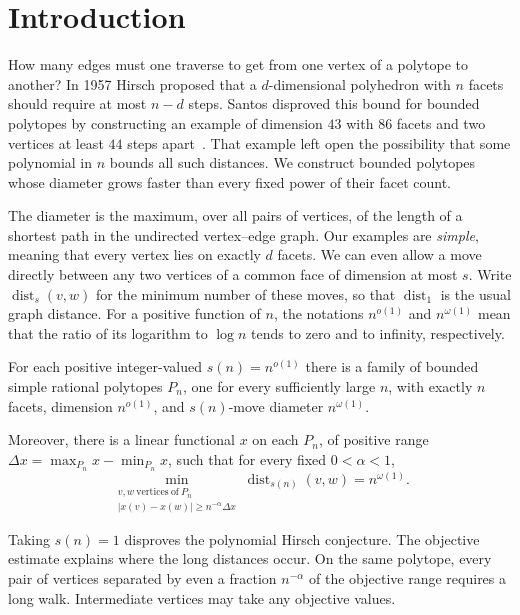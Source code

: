 \section{Introduction}\label{sec:introduction}

How many edges must one traverse to get from one vertex of a polytope to
another? In 1957 Hirsch proposed that a \(d\)-dimensional polyhedron with
\(n\) facets should require at most \(n-d\) steps. Santos disproved this
bound for bounded polytopes by constructing an example of dimension \(43\)
with \(86\) facets and two vertices at least \(44\) steps apart~\cite{santos}.
That example left open the possibility that some polynomial in \(n\)
bounds all such distances. We construct bounded polytopes whose diameter
grows faster than every fixed power of their facet count.

The diameter is the maximum, over all pairs of vertices, of the length of
a shortest path in the undirected vertex--edge graph. Our examples are
\emph{simple}, meaning that every vertex lies on exactly \(d\) facets.
We can even allow a move directly between any two vertices of a common
face of dimension at most \(s\). Write \(\operatorname{dist}_s(v,w)\)
for the minimum number of these moves, so that \(\operatorname{dist}_1\)
is the usual graph distance. For a positive function of \(n\), the
notations \(n^{o(1)}\) and \(n^{\omega(1)}\) mean that the ratio of
its logarithm to \(\log n\) tends to zero and to infinity, respectively.

\begin{theorem}\label{thm:main}
For each positive integer-valued \(s(n)=n^{o(1)}\) there is a family
of bounded simple rational polytopes \(P_n\), one for every sufficiently
large \(n\), with exactly \(n\) facets, dimension \(n^{o(1)}\), and
\(s(n)\)-move diameter \(n^{\omega(1)}\).

Moreover, there is a linear functional \(x\) on each \(P_n\), of positive
range \(\Delta x=\max_{P_n}x-\min_{P_n}x\), such that for every fixed
\(0<\alpha<1\),
\[
 \min_{\substack{v,w\ \mathrm{vertices\ of}\ P_n\\
               |x(v)-x(w)|\ge n^{-\alpha}\Delta x}}
       \operatorname{dist}_{s(n)}(v,w)=n^{\omega(1)}.
\]
\end{theorem}

Taking \(s(n)=1\) disproves the polynomial Hirsch conjecture. The objective
estimate explains where the long distances occur. On the same polytope,
every pair of vertices separated by even a fraction \(n^{-\alpha}\) of
the objective range requires a long walk. Intermediate vertices may take
any objective values.

